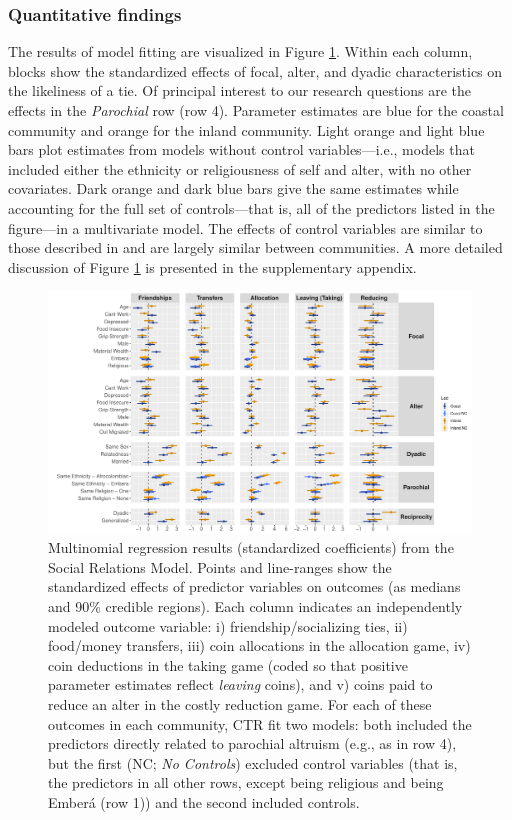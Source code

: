 \documentclass[bibauthoryear]{aa}
\begin{document}
\subsubsection{Quantitative findings}
The results of model fitting are visualized in Figure \ref{colombianres}. Within each column, blocks show the standardized effects of focal, alter, and dyadic characteristics on the likeliness of a tie.  Of principal interest to our research questions  are the effects in the \emph{Parochial} row (row 4). Parameter estimates are blue for the coastal community  and orange for the inland community. Light orange and light blue bars plot estimates from models without control variables---i.e., models that included either the ethnicity or religiousness of self and alter, with no other covariates. Dark orange and dark blue bars give the same estimates while accounting for the full set of controls---that is, all of the predictors listed in the figure---in a multivariate model.  The effects of control variables are similar to those described in \citet{Pisor2020} and are largely similar between communities. A more detailed discussion of Figure \ref{colombianres} is presented in the supplementary appendix. 

 \begin{figure}[t]
 \centering
\includegraphics[width=6.5 in]{All_Games-Standardized_SRM}
\caption{{\footnotesize Multinomial regression results (standardized coefficients) from the Social Relations Model. Points and line-ranges show the standardized effects of predictor variables on outcomes (as medians and 90\% credible regions). Each column indicates an independently modeled outcome variable: i) friendship/socializing ties, ii) food/money transfers, iii) coin allocations in the allocation game, iv) coin deductions in the taking game (coded so that positive parameter estimates reflect \textit{leaving} coins), and v) coins paid to reduce an alter in the costly reduction game. For each of these outcomes in each community, CTR fit two models: both included the predictors directly related to parochial altruism (e.g., as in row 4), but the first (NC; \textit{No Controls}) excluded control variables (that is, the predictors in all other rows, except being religious and being Ember\'a (row 1)) and the second included controls. }
} \label{colombianres}
\end{figure}
\end{document}

